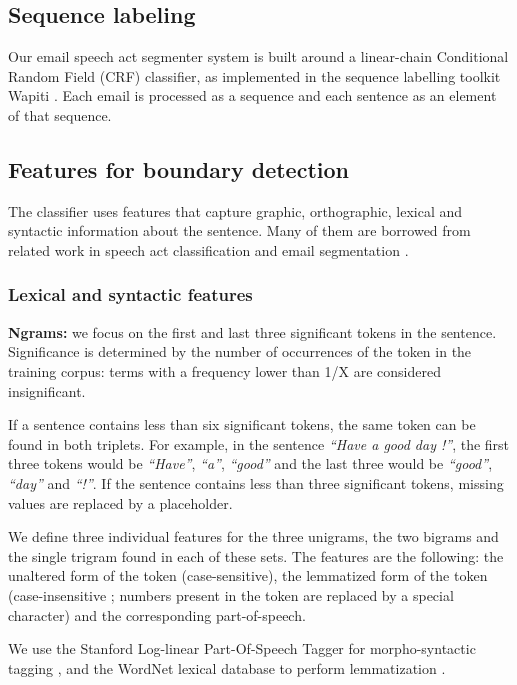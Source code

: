 \documentclass[11pt]{article}
\begin{document}
\subsection{Sequence labeling}

Our email speech act segmenter system is built around a linear-chain Conditional Random Field (CRF) classifier, as implemented in the sequence labelling toolkit Wapiti \cite{lavergne2010practical}. Each email is processed as a sequence and each sentence as an element of that sequence.

\subsection{Features for boundary detection}

The classifier uses features that capture graphic, orthographic, lexical and syntactic information about the sentence. Many of them are borrowed from related work in speech act classification \cite{qadir2011classifying} and email segmentation \cite{lampert2009segmenting}.

\subsubsection{Lexical and syntactic features}

\textbf{Ngrams:} we focus on the first and last three significant tokens in the sentence. Significance is determined by the number of occurrences of the token in the training corpus: terms with a frequency lower than  1/X are considered insignificant. 

If a sentence contains less than six significant tokens, the same token can be found in both triplets. For example, in the sentence \textit{``Have a good day !''}, the first three tokens would be \textit{``Have''}, \textit{``a''}, \textit{``good''} and the last three would be \textit{``good''}, \textit{``day''} and \textit{``!''}. If the sentence contains less than three significant tokens, missing values are replaced by a placeholder.

We define three individual features for the three unigrams, the two bigrams and the single trigram found in each of these sets. The features are the following: the unaltered form of the token (case-sensitive), the lemmatized form of the token (case-insensitive ; numbers present in the token are replaced by a special character) and the corresponding part-of-speech.

We use the Stanford Log-linear Part-Of-Speech Tagger for morpho-syntactic tagging \cite{toutanova2003feature}, and the WordNet lexical database to perform lemmatization \cite{miller1995wordnet}.
\end{document}
